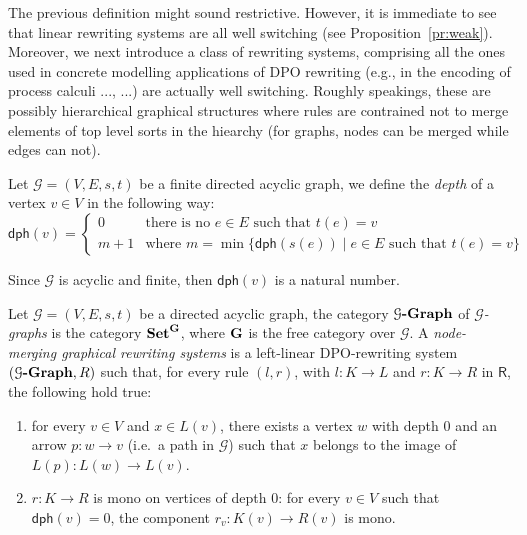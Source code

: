 \documentclass[a4paper,UKenglish,cleveref,pdftex,thm-restate,numberwithinsect,anonymous]{lipics}
\newcommand{\gph}[1]{\mathcal{G}\textbf{\textup{-Graph}}}
\newcommand{\dph}{\mathsf{dph}}
\def\R{\mathsf{R}}
\def\G{\textbf {\textup{G}}}
\def\Set{\textbf {\textup{Set}}}
\begin{document}
The previous definition might sound restrictive. However, it is immediate to see that linear rewriting systems are all well switching (see Proposition~\ref{pr:weak}).
%
Moreover, we next introduce a class of rewriting systems, comprising
all the ones used in concrete modelling applications of DPO rewriting
(e.g., in the encoding of process calculi ..., ...) are  actually well switching.
%
Roughly speakings, these are possibly hierarchical graphical structures where rules are contrained not to merge elements of top level sorts in the hiearchy (for graphs, nodes can be merged while edges can not).

\begin{definition}
Let $\mathcal{G}=(V, E, s, t)$ be a finite directed acyclic graph, we define the \emph{depth} of a vertex $v\in V$ in the following way:
\[\dph(v)=\begin{cases}
0 & \text{there is no $e\in E$ such that $t(e)=v$}\\
m+1 &\text{where } m=\min\{\dph(s(e)) \mid e\in E \text{ such that } t(e)=v \} 
\end{cases}\]
\end{definition}


\begin{remark}
Since $\mathcal{G}$ is acyclic and finite, then $\dph(v)$ is a natural number.
\end{remark}

\begin{definition}
Let $\mathcal{G}=(V, E, s, t)$ be a directed acyclic graph, the category  $\gph{G}$ of \emph{$\mathcal{G}$-graphs} is the category $\Set^{\G}$, where $\G$ is the free category over $\mathcal{G}$. A \emph{node-merging graphical rewriting systems} is a left-linear DPO-rewriting system $(\gph{G}, \R)$ such that, for every rule $(l,r)$, with $l\colon K\to L$ and $r\colon K\to R$  in $\R$, the following hold true:
\begin{enumerate}
	\item for every $v\in V$ and $x\in L(v)$, there exists a vertex $w$ with depth $0$ and an arrow $p\colon w\to v$ (i.e.~a path in $\mathcal{G}$) such that  $x$ belongs to the image of $L(p)\colon L(w)\to L(v)$.
	\item $r\colon K\to R$ is mono on vertices of depth $0$: for every $v\in V$ such that $\dph(v)=0$, the component $r_v:K(v)\to R(v)$ is mono.
\end{enumerate}
\end{definition}
\end{document}
